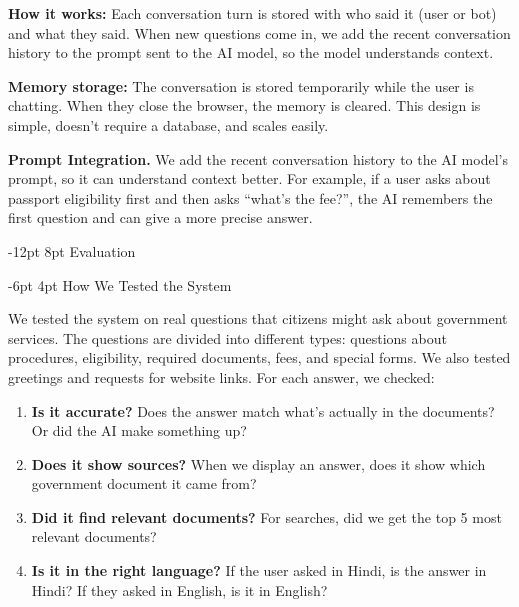 \documentclass[10pt,twocolumn]{article}
\makeatletter
\renewcommand{\section}{\@startsection{section}{1}{\z@}%
  {-12pt \@plus -2pt \@minus -1pt}%
  {8pt \@plus 0.3pt}%
  {\normalfont\Large\bfseries}}
\renewcommand{\subsection}{\@startsection{subsection}{2}{\z@}%
  {-6pt \@plus -1pt \@minus -0.5pt}%
  {4pt \@plus 0.2pt}%
  {\normalfont\large\bfseries}}
\newcommand{\tightlist}{\setlength{\itemsep}{1pt}\setlength{\topsep}{2pt}\setlength{\parsep}{0pt}}
\makeatother
\begin{document}
\smallskip\noindent\textbf{How it works:}  Each conversation turn is stored with who said it (user or bot) and what they said. When new questions come in, we add the recent conversation history to the prompt sent to the AI model, so the model understands context.

\smallskip\noindent\textbf{Memory storage:}  The conversation is stored temporarily while the user is chatting. When they close the browser, the memory is cleared. This design is simple, doesn't require a database, and scales easily.

\smallskip\noindent\textbf{Prompt Integration.}  We add the recent conversation history to the AI model's prompt, so it can understand context better. For example, if a user asks about passport eligibility first and then asks ``what's the fee?'', the AI remembers the first question and can give a more precise answer.

\section{Evaluation}
\label{sec:eval}

\subsection{How We Tested the System}

We tested the system on real questions that citizens might ask about government services. The questions are divided into different types: questions about procedures, eligibility, required documents, fees, and special forms. We also tested greetings and requests for website links. For each answer, we checked:

\begin{enumerate}
  \tightlist
  \item \textbf{Is it accurate?} Does the answer match what's actually in the documents? Or did the AI make something up?
  \item \textbf{Does it show sources?} When we display an answer, does it show which government document it came from?
  \item \textbf{Did it find relevant documents?} For searches, did we get the top 5 most relevant documents?
  \item \textbf{Is it in the right language?} If the user asked in Hindi, is the answer in Hindi? If they asked in English, is it in English?
\end{enumerate}
\end{document}
